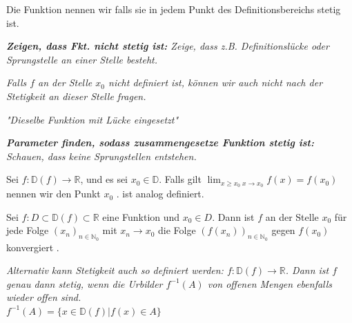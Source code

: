 Die Funktion nennen wir  falls sie in jedem Punkt des Definitionsbereichs stetig ist.


\begin{exercise}
\textit{\textbf{Zeigen, dass Fkt. nicht stetig ist:} Zeige, dass z.B. Definitionslücke oder Sprungstelle an einer Stelle besteht.}    
\end{exercise}

\textit{Falls $f$ an der Stelle $x_0$ nicht definiert ist, können wir auch nicht nach der Stetigkeit an dieser Stelle fragen.}

\textit{ "Dieselbe Funktion mit Lücke eingesetzt"}

\begin{exercise}
\textit{
\textbf{Parameter finden, sodass zusammengesetze Funktion stetig ist:} Schauen, dass keine Sprungstellen entstehen.
}
\end{exercise}

Sei $f: \mathbb{D}(f) \rightarrow \mathbb{R}$, und es sei $x_0 \in \mathbb{D}$. Falls gilt $\lim_{x \geq x_0\; x \rightarrow x_0} f(x) = f(x_0)$ nennen wir den Punkt $x_0$ .  ist analog definiert.

Sei $f: D \subset \mathbb{D}(f) \subset \mathbb{R}$ eine Funktion und $x_0 \in D$. Dann ist $f$ an der Stelle $x_0$  für jede Folge $(x_n)_{n \in \mathbb{N}_0}$ mit $x_n \rightarrow x_0$ die Folge $(f(x_n))_{n \in \mathbb{N}_0}$ gegen $f(x_0)$ konvergiert .

\textit{Alternativ kann Stetigkeit auch so definiert werden: $f: \mathbb{D} (f) \rightarrow \mathbb{R}$. Dann ist $f$ genau dann stetig, wenn die Urbilder $f^{-1}(A)$ von offenen Mengen ebenfalls wieder offen sind.\\
$f^{-1}(A)= \{x \in \mathbb{D}(f)|f(x) \in A\}$}

